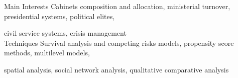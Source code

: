 





\begin{cvskills}

\cvskill
{Main Interests}
{Cabinets composition and allocation, ministerial turnover, presidential systems, political elites, }

\cvskill
{}
{civil service systems, crisis management}\\

\cvskill
{Techniques} 
{Survival analysis and competing risks models, propensity score methods, multilevel models, }

\cvskill
{} 
{spatial analysis, social network analysis, qualitative comparative analysis} \\

\end{cvskills}
